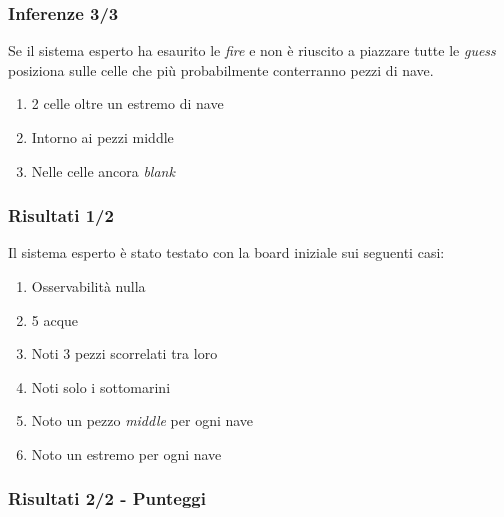 \documentclass[11pt]{beamer}
\begin{document}
\begin{frame}
    \frametitle{Inferenze 3/3}
    Se il sistema esperto ha esaurito le \emph{fire} e non è riuscito a piazzare tutte le \emph{guess} posiziona sulle celle che più probabilmente conterranno pezzi di nave.
    \begin{enumerate}
        \item 2 celle oltre un estremo di nave 
        \item Intorno ai pezzi middle
        \item Nelle celle ancora \emph{blank}
    \end{enumerate}
\end{frame}

\begin{frame}
    \frametitle{Risultati 1/2}
    Il sistema esperto è stato testato con la board iniziale sui seguenti casi:
    \begin{enumerate}
        \item Osservabilità nulla
        \item 5 acque 
        \item Noti 3 pezzi scorrelati tra loro
        \item Noti solo i sottomarini
        \item Noto un pezzo \emph{middle} per ogni nave
        \item Noto un estremo per ogni nave
    \end{enumerate}
\end{frame}

\begin{frame}
    \frametitle{Risultati 2/2 - Punteggi}
\end{frame}
\end{document}
